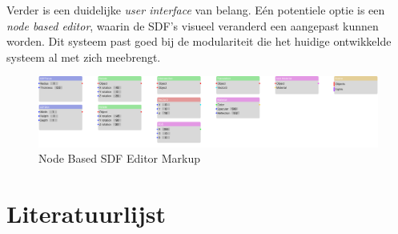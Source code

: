 \documentclass[12pt, a4paper]{article}
\begin{document}
Verder is een duidelijke \textit{user interface} van belang. Eén potentiele optie is een \textit{node based editor}, waarin de SDF's visueel veranderd een aangepast kunnen worden. Dit systeem past goed bij de modulariteit die het huidige ontwikkelde systeem al met zich meebrengt.

\begin{figure}[H]
	\centering
	\includegraphics[width=\textwidth]{node_editor.png}
	\caption{Node Based SDF Editor Markup}
	\label{fig:node_editor}
\end{figure}
\clearpage
\section{Literatuurlijst}
\begingroup
\renewcommand{\section}[2]{}%


\endgroup
\clearpage
\end{document}
